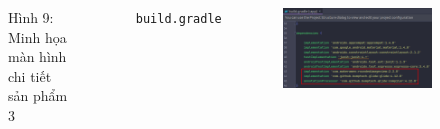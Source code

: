 \documentclass{beamer}
\begin{document}
\begin{frame}
\begin{columns}
\begin{figure}
            \caption{\centering\tiny{Hình 9: Minh họa màn hình chi tiết sản phẩm 3}}
        \end{figure}
        \indent \texttt{build.gradle}
        \begin{figure}
            \centering
            \includegraphics[width=\textwidth]{images/35.png}
        \end{figure}
    \end{columns}
\end{frame}
\end{document}
